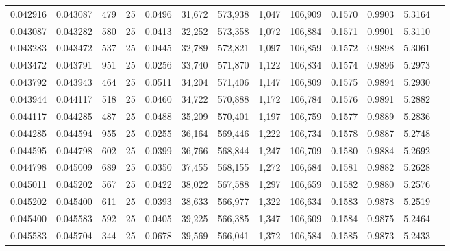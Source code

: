 \begin{tabular}{rrrrrrrrrrrrr}
0.042916 & 0.043087 &   479 &  25 &                                     0.0496 &  31,672 & 573,938 &   1,047 & 106,909 & 0.1570 & 0.9903 & 5.3164 \\
0.043087 & 0.043282 &   580 &  25 &                                     0.0413 &  32,252 & 573,358 &   1,072 & 106,884 & 0.1571 & 0.9901 & 5.3110 \\
0.043283 & 0.043472 &   537 &  25 &                                     0.0445 &  32,789 & 572,821 &   1,097 & 106,859 & 0.1572 & 0.9898 & 5.3061 \\
0.043472 & 0.043791 &   951 &  25 &                                     0.0256 &  33,740 & 571,870 &   1,122 & 106,834 & 0.1574 & 0.9896 & 5.2973 \\
0.043792 & 0.043943 &   464 &  25 &                                     0.0511 &  34,204 & 571,406 &   1,147 & 106,809 & 0.1575 & 0.9894 & 5.2930 \\
0.043944 & 0.044117 &   518 &  25 &                                     0.0460 &  34,722 & 570,888 &   1,172 & 106,784 & 0.1576 & 0.9891 & 5.2882 \\
0.044117 & 0.044285 &   487 &  25 &                                     0.0488 &  35,209 & 570,401 &   1,197 & 106,759 & 0.1577 & 0.9889 & 5.2836 \\
0.044285 & 0.044594 &   955 &  25 &                                     0.0255 &  36,164 & 569,446 &   1,222 & 106,734 & 0.1578 & 0.9887 & 5.2748 \\
0.044595 & 0.044798 &   602 &  25 &                                     0.0399 &  36,766 & 568,844 &   1,247 & 106,709 & 0.1580 & 0.9884 & 5.2692 \\
0.044798 & 0.045009 &   689 &  25 &                                     0.0350 &  37,455 & 568,155 &   1,272 & 106,684 & 0.1581 & 0.9882 & 5.2628 \\
0.045011 & 0.045202 &   567 &  25 &                                     0.0422 &  38,022 & 567,588 &   1,297 & 106,659 & 0.1582 & 0.9880 & 5.2576 \\
0.045202 & 0.045400 &   611 &  25 &                                     0.0393 &  38,633 & 566,977 &   1,322 & 106,634 & 0.1583 & 0.9878 & 5.2519 \\
0.045400 & 0.045583 &   592 &  25 &                                     0.0405 &  39,225 & 566,385 &   1,347 & 106,609 & 0.1584 & 0.9875 & 5.2464 \\
0.045583 & 0.045704 &   344 &  25 &                                     0.0678 &  39,569 & 566,041 &   1,372 & 106,584 & 0.1585 & 0.9873 & 5.2433 \\

\end{tabular}
